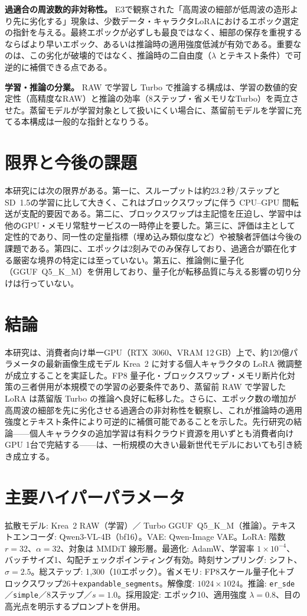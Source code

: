 \documentclass[10pt,twocolumn]{ltjsarticle}
\begin{document}
\textbf{過適合の周波数的非対称性。} E3で観察された「高周波の細部が低周波の造形より先に劣化する」現象は、少数データ・キャラクタLoRAにおけるエポック選定の指針を与える。最終エポックが必ずしも最良ではなく、細部の保存を重視するならばより早いエポック、あるいは推論時の適用強度低減が有効である。重要なのは、この劣化が破壊的ではなく、推論時の二自由度（$\lambda$ とテキスト条件）で可逆的に補償できる点である。

\textbf{学習・推論の分業。} RAW で学習し Turbo で推論する構成は、学習の数値的安定性（高精度なRAW）と推論の効率（8ステップ・省メモリなTurbo）を両立させた。蒸留モデルが学習対象として扱いにくい場合に、蒸留前モデルを学習に充てる本構成は一般的な指針となりうる。

\section{限界と今後の課題}
本研究には次の限界がある。第一に、スループットは約23.2\,秒/ステップとSD~1.5の学習に比して大きく、これはブロックスワップに伴う CPU--GPU 間転送が支配的要因である。第二に、ブロックスワップは主記憶を圧迫し、学習中は他のGPU・メモリ常駐サービスの一時停止を要した。第三に、評価は主として定性的であり、同一性の定量指標（埋め込み類似度など）や被験者評価は今後の課題である。第四に、エポックは2刻みでのみ保存しており、過適合が顕在化する厳密な境界の特定には至っていない。第五に、推論側に量子化（GGUF~Q5\_K\_M）を併用しており、量子化が転移品質に与える影響の切り分けは行っていない。

\section{結論}
本研究は、消費者向け単一GPU（RTX~3060、VRAM 12\,GB）上で、約120億パラメータの最新画像生成モデル Krea~2 に対する個人キャラクタの LoRA 微調整が成立することを実証した。FP8 量子化・ブロックスワップ・メモリ断片化対策の三者併用が本規模での学習の必要条件であり、蒸留前 RAW で学習した LoRA は蒸留版 Turbo の推論へ良好に転移した。さらに、エポック数の増加が高周波の細部を先に劣化させる過適合の非対称性を観察し、これが推論時の適用強度とテキスト条件により可逆的に補償可能であることを示した。先行研究の結論——個人キャラクタの追加学習は有料クラウド資源を用いずとも消費者向けGPU 1台で完結する——は、一桁規模の大きい最新世代モデルにおいても引き続き成立する。

\section{主要ハイパーパラメータ}
拡散モデル: Krea~2 RAW（学習）／ Turbo GGUF~Q5\_K\_M（推論）。テキストエンコーダ: Qwen3-VL-4B（bf16）。VAE: Qwen-Image VAE。LoRA: 階数 $r=32$、$\alpha=32$、対象は MMDiT 線形層。最適化: AdamW、学習率 $1\times10^{-4}$、バッチサイズ1、勾配チェックポインティング有効。時刻サンプリング: シフト、$\sigma=2.5$。総ステップ: 1{,}300（10エポック）。省メモリ: FP8スケール量子化＋ブロックスワップ26＋\texttt{expandable\_segments}。解像度: $1024\times1024$。推論: \texttt{er\_sde}／\texttt{simple}／8ステップ／$s=1.0$。採用設定: エポック10、適用強度 $\lambda=0.8$、目の高光点を明示するプロンプトを併用。
\end{document}
